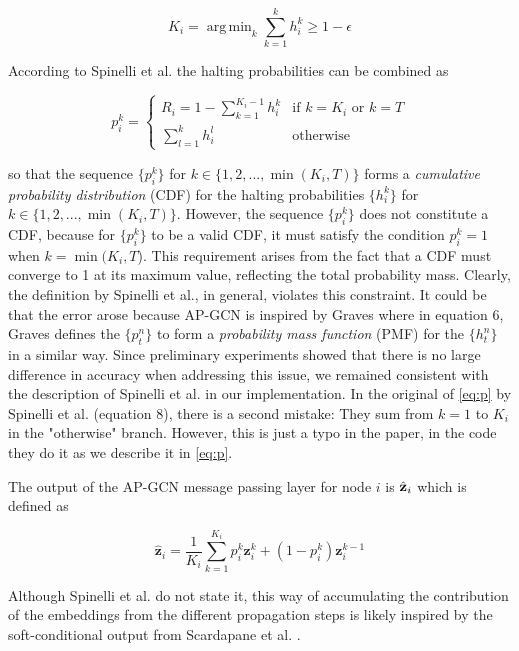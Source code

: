 \documentclass{gdl}
\DeclareMathOperator*{\argmin}{arg\,min}
\begin{document}
\begin{equation}
    K_i = \argmin_{k} \sum_{k=1}^{k} h_i^k \geq 1-\epsilon
\end{equation}

\noindent According to Spinelli et al. the halting probabilities can be combined as

\begin{equation}
    p_i^k = 
    \begin{cases}
    R_i = 1 - \sum_{k=1}^{K_i - 1} h_i^k & \text{if } k = K_i \text{ or } k = T \\
    \sum_{l=1}^{k} h_i^l & \text{otherwise}
    \end{cases}
    \label{eq:p}
\end{equation}

\noindent so that the sequence $\{p_i^k\}$ for $k \in \{1,2,...,\min(K_i, T)\}$ forms a \textit{cumulative probability distribution} (CDF) for the halting probabilities $\{h_i^k\}$ for $k \in \{1,2,...,\min(K_i, T)\}$. However, the sequence $\{p_i^k\}$ does not constitute a CDF, because for $\{p_i^k\}$ to be a valid CDF, it must satisfy the condition $p_i^k = 1$ when $k = \min(K_i,T$). This requirement arises from the fact that a CDF must converge to 1 at its maximum value, reflecting the total probability mass. Clearly, the definition by Spinelli et al., in general, violates this constraint. It could be that the error arose because AP-GCN is inspired by Graves \cite{graves2017} where in equation 6, Graves defines the $\{p_t^n\}$ to form a \textit{probability mass function} (PMF) for the $\{h_t^n\}$ in a similar way. Since preliminary experiments showed that there is no large difference in accuracy when addressing this issue, we remained consistent with the description of Spinelli et al. in our implementation. In the original of \autoref{eq:p} by Spinelli et al. (equation 8), there is a second mistake: They sum from $k=1$ to $K_i$ in the "otherwise" branch. However, this is just a typo in the paper, in the code they do it as we describe it in \autoref{eq:p}.

The output of the AP-GCN message passing layer for node $i$ is $\hat{\bf{z}}_i$ which is defined as

\begin{equation}
\hat{\mathbf{z}}_i = \frac{1}{K_i} \sum_{k=1}^{K_i} p_i^k \mathbf{z}^k_i + (1-p^k_i) \mathbf{z}_i^{k-1} 
\label{eq:aggregate}
\end{equation}

\noindent Although Spinelli et al. do not state it, this way of accumulating the contribution of the embeddings from the different propagation steps is likely inspired by the soft-conditional output from Scardapane et al. \cite{scardapane2020}.
\end{document}
